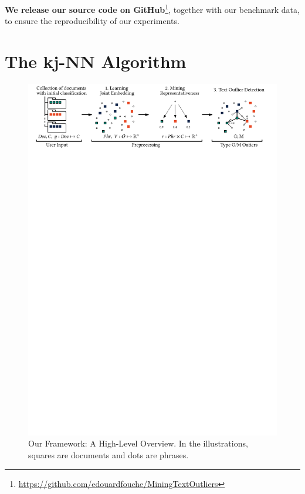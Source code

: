 \textbf{We release our source code on GitHub}\footnote{\url{https://github.com/edouardfouche/MiningTextOutliers}}, together with our benchmark data, 
to ensure the reproducibility of our experiments. 
\enlargethispage{\baselineskip} %

\section{The \acrshort{kj-NN} Algorithm}
\label{sec:framework}

\begin{figure}
	\includegraphics[width=\linewidth]{part4-figures/workflow5-compressed.pdf}
	\caption{Our Framework: A High-Level Overview. In the illustrations, squares are documents and dots are phrases.}
	\label{fig:workflow}
\end{figure} 

